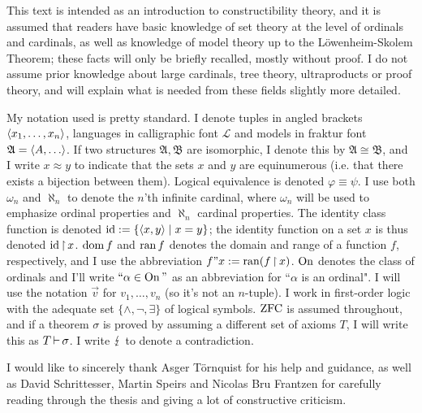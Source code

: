 \begin{onehalfspacing}

This text is intended as an introduction to constructibility theory, and it is assumed that readers have basic knowledge of set theory at the level of ordinals and cardinals, as well as knowledge of model theory up to the Löwenheim-Skolem Theorem; these facts will only be briefly recalled, mostly without proof. I do not assume prior knowledge about large cardinals, tree theory, ultraproducts or proof theory, and will explain what is needed from these fields slightly more detailed.

My notation used is pretty standard. I denote tuples in angled brackets $\langle x_1,\hdots,x_n\rangle$, languages in calligraphic font $\mathcal{L}$ and models in fraktur font $\mathfrak{A}=\langle A,\hdots\rangle$. If two structures $\mathfrak{A},\mathfrak{B}$ are isomorphic, I denote this by $\mathfrak{A}\cong\mathfrak{B}$, and I write $x\approx y$ to indicate that the sets $x$ and $y$ are equinumerous (i.e. that there exists a bijection between them). Logical equivalence is denoted $\varphi\equiv\psi$. I use both $\omega_n$ and $\aleph_n$ to denote the $n$'th infinite cardinal, where $\omega_n$ will be used to emphasize ordinal properties and $\aleph_n$ cardinal properties. The identity class function is denoted $\operatorname{id}:=\{\langle x,y\rangle\mid x=y\}$; the identity function on a set $x$ is thus denoted $\operatorname{id}\operatorname{\upharpoonright} x$. $\operatorname{dom} f$ and $\operatorname{ran} f$ denotes the domain and range of a function $f$, respectively, and I use the abbreviation $f"x:=\operatorname{ran}(f\operatorname{\upharpoonright} x)$. $\operatorname{On}$ denotes the class of ordinals and I'll write $``\alpha\in\operatorname{On}"$ as an abbreviation for ``$\alpha$ is an ordinal". I will use the notation $\vec{v}$ for $v_1,\hdots,v_n$ (so it's not an $n$-tuple). I work in first-order logic with the adequate set $\{\land,\lnot,\exists\}$ of logical symbols. $\operatorname{ZFC}$ is assumed throughout, and if a theorem $\sigma$ is proved by assuming a different set of axioms $T$, I will write this as $T\operatorname{\vdash}\sigma$. I write $\operatorname{\lightning}$ to denote a contradiction.

I would like to sincerely thank Asger Törnquist for his help and guidance, as well as David Schrittesser, Martin Speirs and Nicolas Bru Frantzen for carefully reading through the thesis and giving a lot of constructive criticism.

\end{onehalfspacing}

\setlength{\parindent}{0pt}